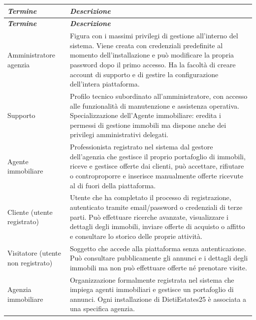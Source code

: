 \documentclass[a4paper,11pt]{article}
\renewcommand{\arraystretch}{1.18}
\begin{document}
\renewcommand{\arraystretch}{1.6}
\begin{longtable}{|p{4.2cm}|p{10.5cm}|}
\hline
\rowcolor[HTML]{010066}
{\color[HTML]{FFFFFF} \textit{\textbf{Termine}}} & {\color[HTML]{FFFFFF} \textit{\textbf{Descrizione}}} \\ \hline
\endfirsthead
\hline
\rowcolor[HTML]{010066}
{\color[HTML]{FFFFFF} \textit{\textbf{Termine}}} & {\color[HTML]{FFFFFF} \textit{\textbf{Descrizione}}} \\ \hline
\endhead

Amministratore agenzia &
Figura con i massimi privilegi di gestione all'interno del sistema. Viene creata con credenziali predefinite al momento dell'installazione e può modificare la propria password dopo il primo accesso. Ha la facoltà di creare account di supporto e di gestire la configurazione dell'intera piattaforma. \\ \hline

Supporto &
Profilo tecnico subordinato all'amministratore, con accesso alle funzionalità di manutenzione e assistenza operativa. Specializzazione dell'Agente immobiliare: eredita i permessi di gestione immobili ma dispone anche dei privilegi amministrativi delegati. \\ \hline

Agente immobiliare &
Professionista registrato nel sistema dal gestore dell'agenzia che gestisce il proprio portafoglio di immobili, riceve e gestisce offerte dai clienti, può accettare, rifiutare o controproporre e inserisce manualmente offerte ricevute al di fuori della piattaforma. \\ \hline

Cliente (utente registrato) &
Utente che ha completato il processo di registrazione, autenticato tramite email/password o credenziali di terze parti. Può effettuare ricerche avanzate, visualizzare i dettagli degli immobili, inviare offerte di acquisto o affitto e consultare lo storico delle proprie attività. \\ \hline

Visitatore (utente non registrato) &
Soggetto che accede alla piattaforma senza autenticazione. Può consultare pubblicamente gli annunci e i dettagli degli immobili ma non può effettuare offerte né prenotare visite. \\ \hline

Agenzia immobiliare &
Organizzazione formalmente registrata nel sistema che impiega agenti immobiliari e gestisce un portafoglio di annunci. Ogni installazione di DietiEstates25 è associata a una specifica agenzia. \\ \hline


\end{longtable}
\end{document}
